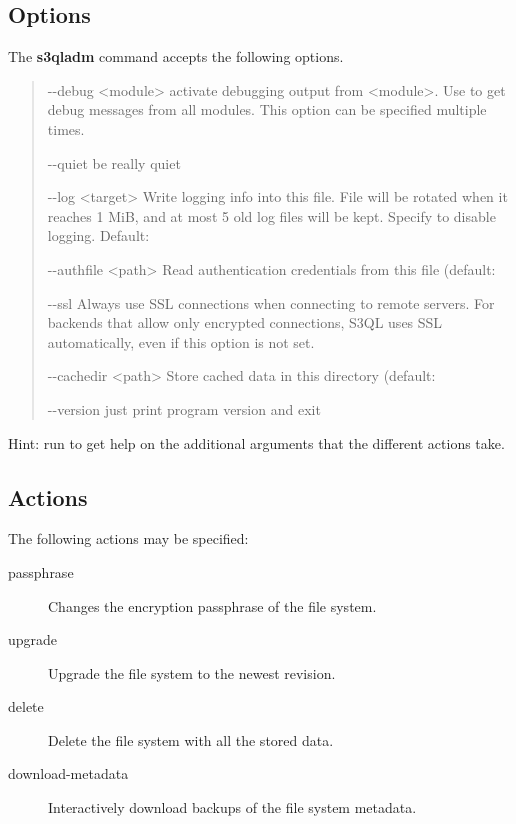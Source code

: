 \documentclass[letterpaper,10pt,english]{sphinxmanual}
\begin{document}
\subsection{Options}
\label{man/adm:options}
The \textbf{s3qladm} command accepts the following options.
\begin{quote}
\begin{optionlist}{3cm}
\item [-{-}debug \textless{}module\textgreater{}]  
activate debugging output from \textless{}module\textgreater{}. Use  to get
debug messages from all modules. This option can be
specified multiple times.
\item [-{-}quiet]  
be really quiet
\item [-{-}log \textless{}target\textgreater{}]  
Write logging info into this file. File will be rotated
when it reaches 1 MiB, and at most 5 old log files will
be kept. Specify  to disable logging. Default:
\item [-{-}authfile \textless{}path\textgreater{}]  
Read authentication credentials from this file (default:
\item [-{-}ssl]  
Always use SSL connections when connecting to remote
servers. For backends that allow only encrypted
connections, S3QL uses SSL automatically, even if this
option is not set.
\item [-{-}cachedir \textless{}path\textgreater{}]  
Store cached data in this directory (default: 
\item [-{-}version]  
just print program version and exit
\end{optionlist}
\end{quote}

Hint: run  to get help on the additional arguments
that the different actions take.


\subsection{Actions}
\label{man/adm:actions}
The following actions may be specified:
\begin{description}
\item[{passphrase}] \leavevmode
Changes the encryption passphrase of the file system.

\item[{upgrade}] \leavevmode
Upgrade the file system to the newest revision.

\item[{delete}] \leavevmode
Delete the file system with all the stored data.

\item[{download-metadata}] \leavevmode
Interactively download backups of the file system metadata.

\end{description}
\end{document}
